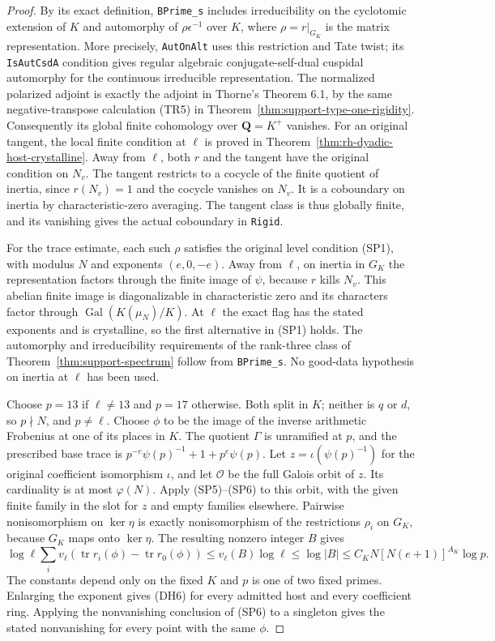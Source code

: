 \begin{proof}
By its exact definition, \texttt{BPrime\_s} includes irreducibility
on the cyclotomic extension of $K$ and automorphy of
$\rho\epsilon^{-1}$ over $K$, where $\rho=r|_{G_K}$ is the
matrix representation.  More precisely, \texttt{AutOnAlt}
uses this restriction and Tate twist; its
\texttt{IsAutCsdA} condition gives regular algebraic
conjugate-self-dual cuspidal automorphy for the continuous
irreducible representation.  The normalized polarized adjoint
is exactly the adjoint in Thorne's Theorem 6.1, by the same
negative-transpose calculation (TR5) in
Theorem~\ref{thm:support-type-one-rigidity}.  Consequently its
global finite cohomology over $\mathbf Q=K^+$ vanishes.
For an original tangent, the local finite condition at $\ell$
is proved in Theorem~\ref{thm:rh-dyadic-host-crystalline}.
Away from $\ell$, both $r$ and the tangent have the original
condition on $N_v$.  The tangent restricts to a cocycle of
the finite quotient of inertia, since $r(N_v)=1$ and the
cocycle vanishes on $N_v$.  It is a coboundary on inertia
by characteristic-zero averaging.  The tangent class is thus
globally finite, and its vanishing gives the actual coboundary
in \texttt{Rigid}.

For the trace estimate, each such $\rho$ satisfies the original
level condition (SP1), with modulus $N$ and exponents $(e,0,-e)$.
Away from $\ell$, on inertia in $G_K$ the representation
factors through the finite image of $\psi$, because $r$
kills $N_v$.  This abelian finite image is diagonalizable in
characteristic zero and its characters factor through
$\operatorname{Gal}(K(\mu_N)/K)$.  At $\ell$ the exact flag
has the stated exponents and is crystalline, so the first
alternative in (SP1) holds.  The automorphy and irreducibility
requirements of the rank-three class of
Theorem~\ref{thm:support-spectrum} follow from \texttt{BPrime\_s}.
No good-data hypothesis on inertia at $\ell$ has been used.

Choose $p=13$ if $\ell\ne13$ and $p=17$ otherwise.
Both split in $K$; neither is $q$ or $d$, so $p\nmid N$,
and $p\ne\ell$.  Choose $\phi$ to be the image of the inverse
arithmetic Frobenius at one of its places in $K$.
The quotient $\Gamma$ is unramified at $p$, and the prescribed
base trace is
$p^{-e}\psi(p)^{-1}+1+p^e\psi(p)$.
Let $z=\iota(\psi(p)^{-1})$ for the original coefficient
isomorphism $\iota$, and let $\mathcal O$ be the full
Galois orbit of $z$.  Its cardinality is at most $\varphi(N)$.
Apply (SP5)--(SP6) to this orbit, with the given finite family
in the slot for $z$ and empty families elsewhere.  Pairwise
nonisomorphism on $\ker\eta$ is exactly nonisomorphism of
the restrictions $\rho_i$ on $G_K$, because $G_K$ maps
onto $\ker\eta$.  The resulting nonzero integer $B$ gives
\[
 \log\ell\sum_i v_\ell(\operatorname{tr}r_i(\phi)
                         -\operatorname{tr}r_0(\phi))
 \le v_\ell(B)\log\ell\le\log|B|
 \le C_K N[N(e+1)]^{A_K}\log p .
\]
The constants depend only on the fixed $K$ and $p$ is one
of two fixed primes.  Enlarging the exponent gives (DH6)
for every admitted host and every coefficient ring.  Applying
the nonvanishing conclusion of (SP6) to a singleton gives
the stated nonvanishing for every point with the same $\phi$.
\end{proof}

